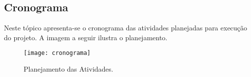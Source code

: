 \begin{landscape}
\chapter[Cronograma]{Cronograma}
\label{chap:cronograma}
	
	Neste tópico apresenta-se o cronograma das atividades planejadas para execução do projeto. A imagem a seguir ilustra o planejamento.

	\begin{figure}[h]
		\centering
		\texttt{[image: cronograma]}
		\caption{Planejamento das Atividades.}
		\label{fig:cronograma}
	\end{figure}


\end{landscape}
